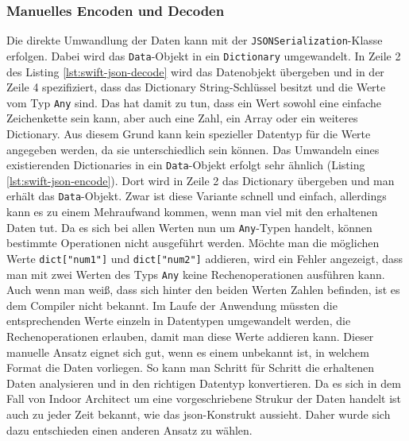 \subsubsection{Manuelles Encoden und Decoden}
Die direkte Umwandlung der Daten kann mit der \texttt{JSONSerialization}-Klasse erfolgen.
Dabei wird das \texttt{Data}-Objekt in ein \texttt{Dictionary} umgewandelt.
In Zeile 2 des Listing \ref{lst:swift-json-decode} wird das Datenobjekt übergeben und in der Zeile 4 spezifiziert, dass das Dictionary String-Schlüssel besitzt und die Werte vom Typ \texttt{Any} sind.
Das hat damit zu tun, dass ein Wert sowohl eine einfache Zeichenkette sein kann, aber auch eine Zahl, ein Array oder ein weiteres Dictionary.
Aus diesem Grund kann kein spezieller Datentyp für die Werte angegeben werden, da sie unterschiedlich sein können.
Das Umwandeln eines existierenden Dictionaries in ein \texttt{Data}-Objekt erfolgt sehr ähnlich (Listing \ref{lst:swift-json-encode}).
Dort wird in Zeile 2 das Dictionary übergeben und man erhält das \texttt{Data}-Objekt.\pbreak%
%
Zwar ist diese Variante schnell und einfach, allerdings kann es zu einem Mehraufwand kommen, wenn man viel mit den erhaltenen Daten tut.
Da es sich bei allen Werten nun um \texttt{Any}-Typen handelt, können bestimmte Operationen nicht ausgeführt werden.
Möchte man die möglichen Werte \texttt{dict["num1"]} und \texttt{dict["num2"]} addieren, wird ein Fehler angezeigt, dass man mit zwei Werten des Typs \texttt{Any} keine Rechenoperationen ausführen kann.
Auch wenn man weiß, dass sich hinter den beiden Werten Zahlen befinden, ist es dem Compiler nicht bekannt.
Im Laufe der Anwendung müssten die entsprechenden Werte einzeln in Datentypen umgewandelt werden, die Rechenoperationen erlauben, damit man diese Werte addieren kann.\pbreak%
%
Dieser manuelle Ansatz eignet sich gut, wenn es einem unbekannt ist, in welchem Format die Daten vorliegen.
So kann man Schritt für Schritt die erhaltenen Daten analysieren und in den richtigen Datentyp konvertieren.
Da es sich in dem Fall von Indoor Architect um eine vorgeschriebene Strukur der Daten handelt ist auch zu jeder Zeit bekannt, wie das \ac{json}-Konstrukt aussieht.
Daher wurde sich dazu entschieden einen anderen Ansatz zu wählen.
